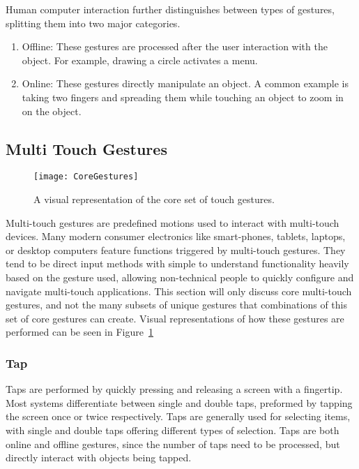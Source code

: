 Human computer interaction further distinguishes between types of gestures, splitting them into two major categories.
\begin{enumerate}
\item Offline: These gestures are processed after the user interaction with the object. For example, drawing a circle activates a menu.
\item Online: These gestures directly manipulate an object. A common example is taking two fingers and spreading them while touching an object to zoom in on the object.
\end{enumerate} 



\subsection{Multi Touch Gestures}
\begin{figure}
\texttt{[image: CoreGestures]}
\caption{A visual representation of the core set of touch gestures. \cite{touchreference} } 
\label{fig:touchgestures}
\end{figure}

Multi-touch gestures are predefined motions used to interact with multi-touch devices.
Many modern consumer electronics like smart-phones, tablets, laptops, or desktop computers feature functions triggered by multi-touch gestures.
They tend to be direct input methods with simple to understand functionality heavily based on the gesture used, allowing non-technical people to quickly configure and navigate multi-touch applications.
This section will only discuss core multi-touch gestures, and not the many subsets of unique gestures that combinations of this set of core gestures can create. Visual representations of how these gestures are performed can be seen in Figure~\ref{fig:touchgestures}

\subsubsection{Tap}

Taps are performed by quickly pressing and releasing a screen with a fingertip. 
Most systems differentiate between single and double taps, preformed by tapping the screen once or twice respectively.
Taps are generally used for selecting items, with single and double taps offering different types of selection.
Taps are both online and offline gestures, since the number of taps need to be processed, but directly interact with objects being tapped.

